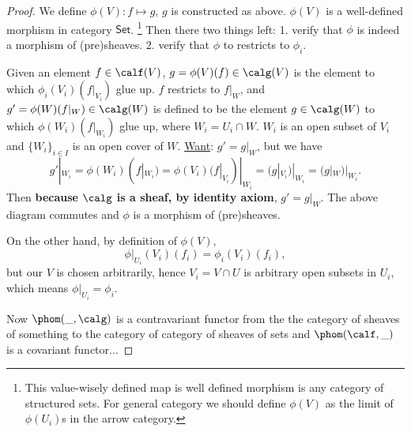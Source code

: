 \begin{proof}
We define $\phi(V):f\mapsto g$, $g$ is constructed as above. $\phi(V)$ is a well-defined morphism in category $\mathsf{Set}$. \footnote{This value-wisely defined map is well defined morphism is any category of structured sets. For general category we should define $\phi(V)$ as the limit of $\phi(U_i)$s in the arrow category.}
Then there two things left: 1. verify that $\phi$ is indeed a morphism of (pre)sheaves. 2. verify that $\phi$ to restricts to $\phi_i$.
\begin{center}
\end{center}
Given an element $f\in\calf(V)$, $g=\phi(V)(f)\in \calg(V)$ is the element to which $\phi_i(V_i)(f|_{V_i})$ glue up. $f$ restricts to $f|_W$, and $g'=\phi(W)(f|_W)\in\calg(W)$ is defined to be the element $g\in \calg(W)$ to which $\phi(W_i)(f|_{W_i})$ glue up, where $W_i=U_i\cap W$. $W_i$ is an open subset of $V_i$ and $\{W_i\}_{i\in I}$ is an open cover of $W$. \underline{Want}: $g'=g|_W$, but we have
$$
g'|_{W_i}=\phi(W_i)(f|_{W_i})=\phi(V_i)(f|_{V_i})|_{W_i}=(g|_{V_i})|_{W_i}
=(g|_W)|_{W_i}.
$$
Then \textbf{because $\calg$ is a sheaf, by identity axiom}, $g'=g|_W$. The above diagram commutes and $\phi$ is a morphism of (pre)sheaves.

On the other hand, by definition of $\phi(V)$,
$$
\phi|_{U_i}(V_i)(f_i)=\phi_i(V_i)(f_i),
$$
but our $V$ is chosen arbitrarily, hence $V_i=V\cap U$ is arbitrary open subsets in $U_i$, which means $\phi|_{U_i}=\phi_i$.

Now $\phom(\_,\calg)$ is a contravariant functor from the the category of sheaves of something to the category of category of sheaves of sets and $\phom(\calf,\_)$ is a covariant functor...
\end{proof}
